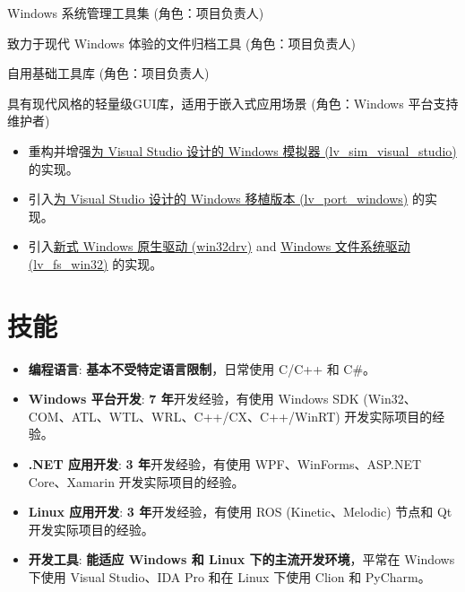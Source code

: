 \documentclass{resume}
\begin{document}
Windows 系统管理工具集 (角色：项目负责人)

致力于现代 Windows 体验的文件归档工具 (角色：项目负责人)

自用基础工具库 (角色：项目负责人)

具有现代风格的轻量级GUI库，适用于嵌入式应用场景 (角色：Windows 平台支持维护者)
\begin{itemize}
  \item 重构并增强\href{https://github.com/lvgl/lv_sim_visual_studio}{为 Visual Studio 设计的 Windows 模拟器 (lv\_sim\_visual\_studio)} 的实现。
  \item 引入\href{https://github.com/lvgl/lv_port_windows}{为 Visual Studio 设计的 Windows 移植版本 (lv\_port\_windows)} 的实现。
  \item 引入\href{https://github.com/lvgl/lv_drivers/pull/117}{新式 Windows 原生驱动 (win32drv)} and \href{https://github.com/lvgl/lvgl/pull/2701}{Windows 文件系统驱动 (lv\_fs\_win32)} 的实现。
\end{itemize}

\section{技能}
\begin{itemize}

  \item \textbf{编程语言}:
    \textbf{基本不受特定语言限制}，日常使用 C/C++ 和 C\#。

  \item \textbf{Windows 平台开发}:
    \textbf{7 年}开发经验，有使用 Windows SDK (Win32、COM、ATL、WTL、WRL、C++/CX、C++/WinRT) 开发实际项目的经验。

  \item \textbf{.NET 应用开发}:
    \textbf{3 年}开发经验，有使用 WPF、WinForms、ASP.NET Core、Xamarin 开发实际项目的经验。
  
  \item \textbf{Linux 应用开发}:
    \textbf{3 年}开发经验，有使用 ROS (Kinetic、Melodic) 节点和 Qt 开发实际项目的经验。

  \item \textbf{开发工具}:
    \textbf{能适应 Windows 和 Linux 下的主流开发环境}，平常在 Windows 下使用 Visual Studio、IDA Pro 和在 Linux 下使用 Clion 和 PyCharm。

\end{itemize}
\end{document}
